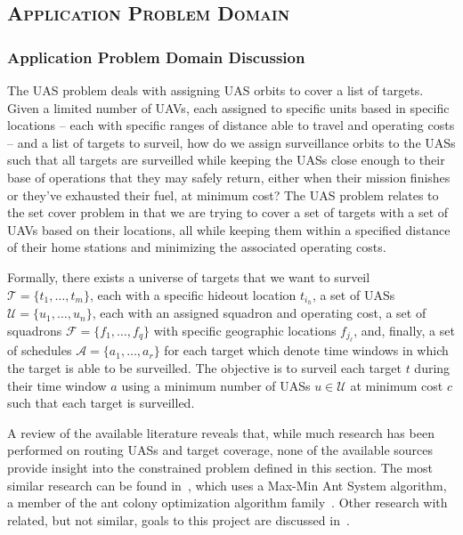 \documentclass[conference]{IEEEtran}
\begin{document}

\subsection{\textsc{Application Problem Domain}} \label{sec:application}

\subsubsection{Application Problem Domain Discussion} \label{sec:APD}

The UAS problem deals with assigning UAS orbits to cover a list of targets.
Given a limited number of UAVs, each assigned to specific units based in
specific locations -- each with specific ranges of distance able to travel and
operating costs -- and a list of targets to surveil, how do we assign
surveillance orbits to the UASs such that all targets are surveilled while
keeping the UASs close enough to their base of operations that they may safely
return, either when their mission finishes or they've exhausted their fuel, at
minimum cost?  The UAS problem relates to the set cover problem in that we are
trying to cover a set of targets with a set of UAVs based on their locations,
all while keeping them within a specified distance of their home stations and
minimizing the associated operating costs. 

Formally, there exists a universe of targets that we want to surveil
${\mathcal{T} = \lbrace t_1,\ldots,t_m \rbrace}$, each with a specific hideout
location $t_{i_h}$, a set of UASs ${\mathcal{U} = \lbrace u_1,\ldots,u_n
\rbrace}$, each with an assigned squadron and operating cost, a set of
squadrons ${\mathcal{F} = \lbrace f_1,\ldots,f_q \rbrace}$ with specific
geographic locations $f_{j_\ell}$, and, finally, a set of schedules
${\mathcal{A} = \lbrace a_1,\ldots,a_r \rbrace}$ for each target which denote
time windows in which the target is able to be surveilled. The objective is to
surveil each target $t$ during their time window $a$ using a minimum number of
UASs ${u \in \mathcal{U}}$ at minimum cost $c$ such that each target is
surveilled.

A review of the available literature reveals that, while much research has been
performed on routing UASs and target coverage, none of the available sources
provide insight into the constrained problem defined in this section. The most
similar research can be found in~\cite{karakaya2014}, which uses a Max-Min Ant
System algorithm, a member of the ant colony optimization algorithm
family~\cite{wiki:aco}. Other research with related, but not similar, goals to
this project are discussed in~\cite{avellar2015, caillouet2010, carlyle2007,
quintero2010, semsch2009, sundar2013}.
\end{document}
